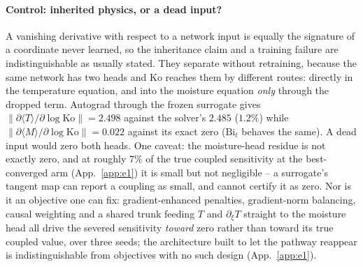 \documentclass{article}
\begin{document}
\paragraph{Control: inherited physics, or a dead input?}\label{par:control} A vanishing derivative with
respect to a network input is equally the signature of a coordinate never learned, so the inheritance
claim and a training failure are indistinguishable as usually stated. They separate without
retraining, because the same network has two heads and $\mathrm{Ko}$ reaches them by different routes:
directly in the temperature equation, and into the moisture equation \emph{only} through the dropped
term. Autograd through the frozen surrogate gives
$\|\partial\langle T\rangle/\partial\log\mathrm{Ko}\|=2.498$ against the solver's $2.485$ ($1.2\%$)
while $\|\partial\langle M\rangle/\partial\log\mathrm{Ko}\|=0.022$ against its exact zero
($\mathrm{Bi}_t$ behaves the same). A dead input would zero both heads. One caveat: the moisture-head
residue is not exactly zero, and at roughly $7\%$ of the true coupled sensitivity at the best-converged
arm (App.~\ref{app:e1}) it is small but not negligible -- a surrogate's tangent map can report a
coupling as small, and cannot certify it as zero. Nor is it an objective one can fix: gradient-enhanced penalties,
gradient-norm balancing, causal weighting and a shared trunk feeding $T$ and $\partial_\xi T$ straight
to the moisture head all drive the severed sensitivity \emph{toward} zero rather than toward its true
coupled value, over three seeds; the architecture built to let the pathway reappear is
indistinguishable from objectives with no such design (App.~\ref{app:e1}).
\end{document}
